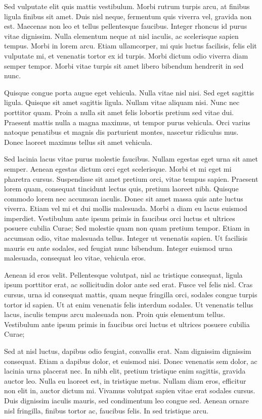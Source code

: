 Sed vulputate elit quis mattis vestibulum. Morbi rutrum turpis arcu, at finibus ligula finibus sit amet. Duis nisl neque, fermentum quis viverra vel, gravida non est. Maecenas non leo et tellus pellentesque faucibus. Integer rhoncus id purus vitae dignissim. Nulla elementum neque at nisl iaculis, ac scelerisque sapien tempus. Morbi in lorem arcu. Etiam ullamcorper, mi quis luctus facilisis, felis elit vulputate mi, et venenatis tortor ex id turpis. Morbi dictum odio viverra diam semper tempor. Morbi vitae turpis sit amet libero bibendum hendrerit in sed nunc.

Quisque congue porta augue eget vehicula. Nulla vitae nisl nisi. Sed eget sagittis ligula. Quisque sit amet sagittis ligula. Nullam vitae aliquam nisi. Nunc nec porttitor quam. Proin a nulla sit amet felis lobortis pretium sed vitae dui. Praesent mattis nulla a magna maximus, ut tempor purus vehicula. Orci varius natoque penatibus et magnis dis parturient montes, nascetur ridiculus mus. Donec laoreet maximus tellus sit amet vehicula.

Sed lacinia lacus vitae purus molestie faucibus. Nullam egestas eget urna sit amet semper. Aenean egestas dictum orci eget scelerisque. Morbi et mi eget mi pharetra cursus. Suspendisse sit amet pretium orci, vitae tempus sapien. Praesent lorem quam, consequat tincidunt lectus quis, pretium laoreet nibh. Quisque commodo lorem nec accumsan iaculis. Donec sit amet massa quis ante luctus viverra. Etiam vel mi et dui mollis malesuada. Morbi a diam eu lacus euismod imperdiet. Vestibulum ante ipsum primis in faucibus orci luctus et ultrices posuere cubilia Curae; Sed molestie quam non quam pretium tempor. Etiam in accumsan odio, vitae malesuada tellus. Integer ut venenatis sapien. Ut facilisis mauris eu ante sodales, sed feugiat nunc bibendum. Integer euismod urna malesuada, consequat leo vitae, vehicula eros.

Aenean id eros velit. Pellentesque volutpat, nisl ac tristique consequat, ligula ipsum porttitor erat, ac sollicitudin dolor ante sed erat. Fusce vel felis nisl. Cras cursus, urna id consequat mattis, quam neque fringilla orci, sodales congue turpis tortor id sapien. Ut at enim venenatis felis interdum sodales. Ut venenatis tellus lacus, iaculis tempus arcu malesuada non. Proin quis elementum tellus. Vestibulum ante ipsum primis in faucibus orci luctus et ultrices posuere cubilia Curae;

Sed at nisl luctus, dapibus odio feugiat, convallis erat. Nam dignissim dignissim consequat. Etiam a dapibus dolor, et euismod nisi. Donec venenatis sem dolor, ac lacinia urna placerat nec. In nibh elit, pretium tristique enim sagittis, gravida auctor leo. Nulla eu laoreet est, in tristique metus. Nullam diam eros, efficitur non elit in, auctor dictum mi. Vivamus volutpat sapien vitae erat sodales cursus. Duis dignissim iaculis mauris, sed condimentum leo congue sed. Aenean ornare nisl fringilla, finibus tortor ac, faucibus felis. In sed tristique arcu.

